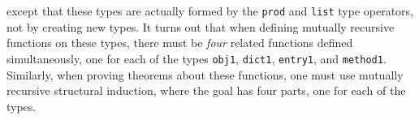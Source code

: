 \documentclass[envcountsame,runningheads]{llncs}
\begin{document}
\noindent
except that these types are actually formed by the
{\tt prod}
and
{\tt list}
type operators, not by creating new types.
It turns out that when defining mutually recursive functions on these
types, there must be {\it four} related functions defined simultaneously,
one for each of the types
{\tt obj1}, {\tt dict1}, {\tt entry1}, and {\tt method1}.
Similarly, when proving theorems about these functions,
one must use mutually recursive structural induction,
where the goal has four parts, one for each of the types.

%
%
%
%
%
%
%
%
%
%
\end{document}
